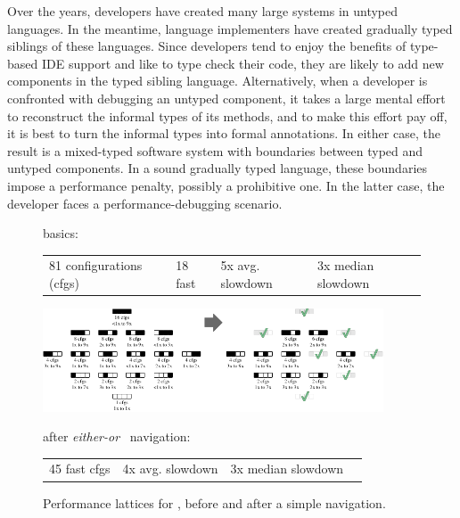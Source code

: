
Over the years, developers have created many large systems in untyped languages.
In the meantime, language implementers have created gradually typed siblings of
these languages.  Since developers tend to enjoy the benefits of type-based IDE
support and like to type check their code, they are likely to add new components
in the typed sibling language. Alternatively, when a developer is confronted
with debugging an untyped component, it takes a large mental effort to
reconstruct the informal types of its methods, and to make this effort pay off,
it is best to turn the informal types into formal annotations. In either case,
the result is a mixed-typed software system with boundaries between typed and
untyped components. In a sound gradually typed language, these boundaries impose
a performance penalty, possibly a prohibitive one. In the latter case, the
developer faces a performance-debugging scenario.

\begin{figure}[htb]

   basics:
  \begin{tabular}{llll}
    81 configurations (cfgs) &
    18 fast &
    5x avg. slowdown &
    3x median slowdown
  \end{tabular}

  \bigskip

  \includegraphics[width=0.9\textwidth]{data/fsm-lattice.pdf}

  after \emph{either-or}~\cite{g-deep-shallow} navigation:
  \begin{tabular}{llll}
    45 fast cfgs &
    4x avg. slowdown &
    3x median slowdown
  \end{tabular}

  \caption{Performance lattices for , before and after a simple navigation.}
  \label{f:fsm-seascape}
\end{figure}

